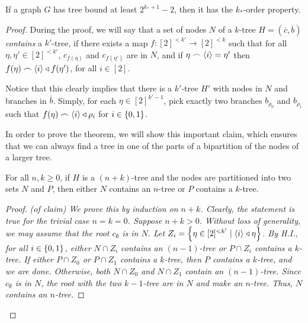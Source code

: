     \theorem\label{tree_implies_order}
        If a graph $G$ has tree bound at least $2^{k_*+1}-2$, then it has the $k_*$-order property.
        \begin{proof}
            During the proof, we will say that a set of nodes $N$ of a $k$-tree $H = (\overline{c},\overline{b})$ \emph{contains} a $k'$-tree, if
            there exists a map $f \colon [2]^{<k'} \longrightarrow [2]^{<k}$ such that for all $\eta, \eta' \in [2]^{<k'}$,
            $c_{f(\eta)}$ and $c_{f(\eta')}$ are in $N$, and if $\eta \frown \left< i \right> = \eta'$ then
            $f(\eta) \frown \left< i \right> \triangleleft f(\eta')$, for all $i \in [2]$.

            Notice that this clearly implies that there is a $k'$-tree $H'$ with nodes in $N$ and branches in $\overline{b}$.
            Simply, for each $\eta \in [2]^{k'-1}$, pick exactly two branches $b_{\rho_0}$ and $b_{\rho_1}$ such that
            $f(\eta)\frown\left< i \right> \triangleleft \rho_i$ for $i \in \left\{ 0,1 \right\}$.

            In order to prove the theorem, we will show this important claim, which ensures that we can always find a tree
            in one of the parts of a bipartition of the nodes of a larger tree.

            \begin{claim}
                For all $n, k \geq 0$, if $H$ is a $(n + k)$-tree and the nodes are partitioned into two sets $N$ and $P$,
                then either $N$ contains an $n$-tree or $P$ contains a $k$-tree.
                \begin{proof} \it{(of claim)}
                    We prove this by induction on $n + k$.
                    Clearly, the statement is true for the trivial case $n = k = 0$.
                    Suppose $n + k > 0$.
                    Without loss of generality, we may assume that the root $c_\emptyset$ is in $N$.
                    Let $Z_i = \left\{ \eta \in [2]^{<k'} \mid \left< i \right> \triangleleft \eta \right\}$.
                    By H.I., for all $i \in \left\{ 0,1 \right\}$, either $N \cap Z_i$ contains an $(n-1)$-tree or
                    $P \cap Z_i$ contains a $k$-tree.
                    If either $P \cap Z_0$ or $P \cap Z_1$ contains a $k$-tree, then $P$ contains a $k$-tree, and we are done.
                    Otherwise, both $N \cap Z_0$ and $N \cap Z_1$ contain an $(n-1)$-tree.
                    Since $c_\emptyset$ is in $N$, the root with the two $k-1$-tree are in $N$ and make an $n$-tree.
                    Thus, $N$ contains an $n$-tree.
                \end{proof}
            \end{claim}


\end{proof}
